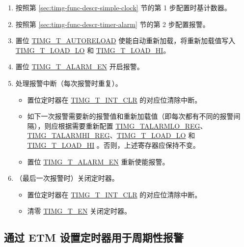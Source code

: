 \documentclass[main\_\_CN.tex]{subfiles}
\begin{document}
\begin{enumerate}
    \item 按照第 \ref{sec:timg-func-descr-simple-clock} 节的第 1 步配置时基计数器。
    \item 按照第 \ref{sec:timg-func-descr-timer-alarm} 节的第 2 步配置报警。
    \item 置位 \hyperref[fielddesc:TIMGTXAUTORELOAD]{TIMG\_T\_AUTORELOAD} 使能自动重新加载，将重新加载值写入 \hyperref[fielddesc:TIMGTXLOADLO]{TIMG\_T\_LOAD\_LO} 和 \hyperref[fielddesc:TIMGTXLOADHI]{TIMG\_T\_LOAD\_HI}。
    \item 置位 \hyperref[fielddesc:TIMGTXALARMEN]{TIMG\_T\_ALARM\_EN} 开启报警。
    \item 处理报警中断（每次报警时重复）。
    \begin{itemize}
        \item 置位定时器在 \hyperref[fielddesc:TIMGTXINTCLR]{TIMG\_T\_INT\_CLR} 的对应位清除中断。
        \item 如下一次报警需要新的报警值和重新加载值（即每次都有不同的报警间隔），则应根据需要重新配置 \hyperref[regdesc:TIMGTXALARMLOREG]{TIMG\_TALARMLO\_REG}、\hyperref[regdesc:TIMGTXALARMHIREG]{TIMG\_TALARMHI\_REG}、\hyperref[fielddesc:TIMGTXLOADLO]{TIMG\_T\_LOAD\_LO} 和 \hyperref[fielddesc:TIMGTXLOADHI]{TIMG\_T\_LOAD\_HI} 。否则，上述寄存器应保持不变。
        \item 置位 \hyperref[fielddesc:TIMGTXALARMEN]{TIMG\_T\_ALARM\_EN} 重新使能报警。
    \end{itemize}
    \item（最后一次报警时）关闭定时器。
    \begin{itemize}
        \item 置位定时器在 \hyperref[fielddesc:TIMGTXINTCLR]{TIMG\_T\_INT\_CLR} 的对应位清除中断。
        \item 清零 \hyperref[fielddesc:TIMGTXEN]{TIMG\_T\_EN} 关闭定时器。
    \end{itemize}
\end{enumerate}

\subsection{通过 ETM 设置定时器用于周期性报警} \label{sec:timg-conf-etm}
\end{document}

